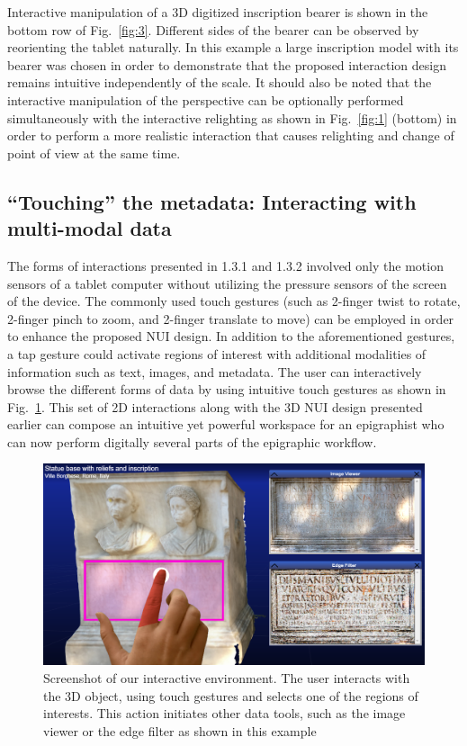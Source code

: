 \documentclass[amsthm,ebook]{saparticle}
\begin{document}
\newpage
Interactive manipulation of a 3D digitized inscription bearer is shown in the bottom row of Fig.~\ref{fig:3}. Different sides of
the bearer can be observed by reorienting the tablet naturally. In this example a large inscription model with its
bearer was chosen in order to demonstrate that the proposed interaction design remains intuitive independently of the
scale. It should also be noted that the interactive manipulation of the perspective can be optionally performed
simultaneously with the interactive relighting as shown in Fig.~\ref{fig:1} (bottom) in order to perform a more realistic
interaction that causes relighting and change of point of view at the same time. 


\subsection{``Touching'' the metadata: Interacting with multi-modal data}


\noindent The forms of interactions presented in 1.3.1 and 1.3.2 involved only the motion sensors of a tablet computer without
utilizing the pressure sensors of the screen of the device. The commonly used touch gestures (such as 2-finger twist to
rotate, 2-finger pinch to zoom, and 2-finger translate to move) can be employed in order to enhance the proposed NUI
design. In addition to the aforementioned gestures, a tap gesture could activate regions of interest with additional
modalities of information such as text, images, and metadata. The user can interactively browse the different forms of
data by using intuitive touch gestures as shown in Fig.~\ref{fig:4}. This set of 2D interactions along with the 3D NUI design
presented earlier can compose an intuitive yet powerful workspace for an epigraphist who can now perform digitally
several parts of the epigraphic workflow. 




\begin{figure}[!hbp]
\centering
 \includegraphics[width=0.8\columnwidth]{EAGLE2016cameraready-img006.png}
\caption{Screenshot of our interactive environment. The user interacts with the 3D object, using touch gestures and
selects one of the regions of interests. This action initiates other data tools, such as the image viewer or the edge
filter as shown in this example}
\label{fig:4}
\end{figure}
\end{document}

